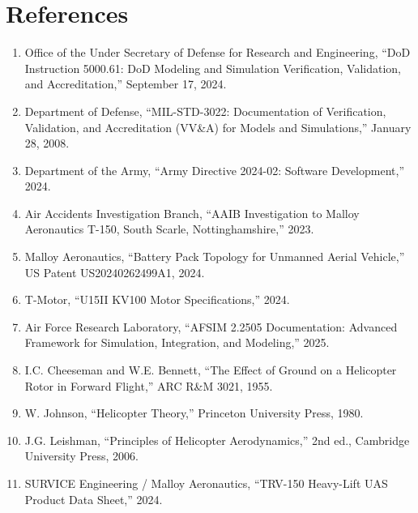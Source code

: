 \pagebreak


\section{\unclass References}\label{sec:References}

\begin{enumerate}
	\item \unclass Office of the Under Secretary of Defense for Research and Engineering, ``DoD Instruction 5000.61: DoD Modeling and Simulation Verification, Validation, and Accreditation,'' September 17, 2024.

	\item \unclass Department of Defense, ``MIL-STD-3022: Documentation of Verification, Validation, and Accreditation (VV\&A) for Models and Simulations,'' January 28, 2008.

	\item \unclass Department of the Army, ``Army Directive 2024-02: Software Development,'' 2024.

	\item \unclass Air Accidents Investigation Branch, ``AAIB Investigation to Malloy Aeronautics T-150, South Scarle, Nottinghamshire,'' 2023.

	\item \unclass Malloy Aeronautics, ``Battery Pack Topology for Unmanned Aerial Vehicle,'' US Patent US20240262499A1, 2024.

	\item \unclass T-Motor, ``U15II KV100 Motor Specifications,'' 2024.

	\item \unclass Air Force Research Laboratory, ``AFSIM 2.2505 Documentation: Advanced Framework for Simulation, Integration, and Modeling,'' 2025.

	\item \unclass I.C. Cheeseman and W.E. Bennett, ``The Effect of Ground on a Helicopter Rotor in Forward Flight,'' ARC R\&M 3021, 1955.

	\item \unclass W. Johnson, ``Helicopter Theory,'' Princeton University Press, 1980.

	\item \unclass J.G. Leishman, ``Principles of Helicopter Aerodynamics,'' 2nd ed., Cambridge University Press, 2006.

	\item \unclass SURVICE Engineering / Malloy Aeronautics, ``TRV-150 Heavy-Lift UAS Product Data Sheet,'' 2024.
\end{enumerate}

\pagebreak

